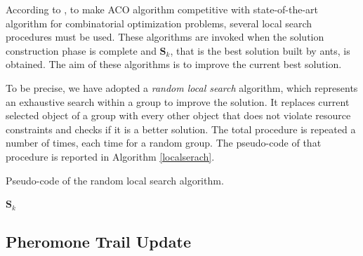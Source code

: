 \documentclass[12pt,a4paper]{report}
\begin{document}
According to \citet{acogrosso}, to make ACO algorithm competitive with  state-of-the-art algorithm for combinatorial optimization problems, several local search procedures must be used. These algorithms are invoked when the solution construction phase is complete and $\textbf{S}_k$, that is the best solution built by ants, is obtained. The aim of these algorithms is to improve the current best solution.

To be precise, we have adopted a \textit{random local search} algorithm, which represents an exhaustive search within a group to improve the solution. It replaces current selected object of a group with every other object that does not violate resource constraints and checks if it is a better solution. The total procedure is repeated a number of times, each time for a random group. The pseudo-code of that procedure is reported in Algorithm \ref{localserach}.
	

\begin{algorithm}\label{localserach}
	\caption{Pseudo-code of the random local search algorithm.}
	
	\Return $\textbf{S}_k$
\end{algorithm}

\subsection{Pheromone Trail Update}
\end{document}
